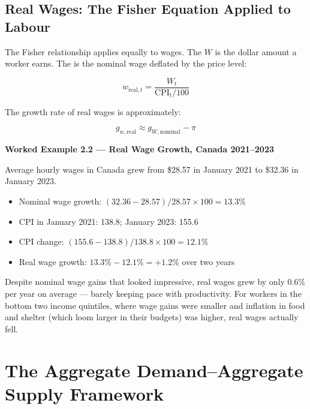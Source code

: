 \subsection{Real Wages: The Fisher Equation Applied to Labour}

The Fisher relationship applies equally to wages. The 
$W$ is the dollar amount a worker earns. The  is the nominal
wage deflated by the price level:

\begin{equation}
  w_{\text{real},t} = \frac{W_t}{\text{CPI}_t / 100}
  \label{eq:real_wage}
\end{equation}

The growth rate of real wages is approximately:

\begin{equation}
  g_{w,\text{real}} \approx g_{W,\text{nominal}} - \pi
  \label{eq:real_wage_growth}
\end{equation}

\noindent\textbf{Worked Example 2.2 --- Real Wage Growth, Canada 2021--2023}

Average hourly wages in Canada grew from \$28.57 in January 2021 to
\$32.36 in January 2023.
\begin{itemize}
  \item Nominal wage growth: $(32.36 - 28.57) / 28.57 \times 100 = 13.3\%$
  \item CPI in January 2021: 138.8; January 2023: 155.6
  \item CPI change: $(155.6 - 138.8)/138.8 \times 100 = 12.1\%$
  \item Real wage growth: $13.3\% - 12.1\% = +1.2\%$ over two years
\end{itemize}

Despite nominal wage gains that looked impressive, real wages grew by
only 0.6\% per year on average --- barely keeping pace with productivity.
For workers in the bottom two income quintiles, where wage gains were
smaller and inflation in food and shelter (which loom larger in their
budgets) was higher, real wages actually fell.

\section{The Aggregate Demand--Aggregate Supply Framework}
\label{sec:adas}

